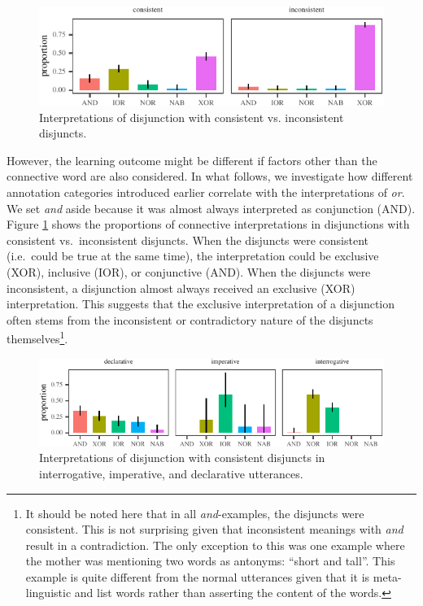 \documentclass[,man,floatsintext]{apa6}
\let\rmarkdownfootnote\footnote%
\def\footnote{\protect\rmarkdownfootnote}
\begin{document}
\begin{figure}[tb]

{\centering \includegraphics{figs/consistencyPlot-1} 

}

\caption{Interpretations of disjunction with consistent vs. inconsistent disjuncts.}\label{fig:consistencyPlot}
\end{figure}

However, the learning outcome might be different if factors other than the connective word are also considered. In what follows, we investigate how different annotation categories introduced earlier correlate with the interpretations of \emph{or}. We set \emph{and} aside because it was almost always interpreted as conjunction (AND). Figure \ref{fig:consistencyPlot} shows the proportions of connective interpretations in disjunctions with consistent vs.~inconsistent disjuncts. When the disjuncts were consistent (i.e.~could be true at the same time), the interpretation could be exclusive (XOR), inclusive (IOR), or conjunctive (AND). When the disjuncts were inconsistent, a disjunction almost always received an exclusive (XOR) interpretation. This suggests that the exclusive interpretation of a disjunction often stems from the inconsistent or contradictory nature of the disjuncts themselves\footnote{It should be noted here that in all \emph{and}-examples, the disjuncts were consistent. This is not surprising given that inconsistent meanings with \emph{and} result in a contradiction. The only exception to this was one example where the mother was mentioning two words as antonyms: \enquote{short and tall}. This example is quite different from the normal utterances given that it is meta-linguistic and list words rather than asserting the content of the words.}.

\begin{figure}[tb]

{\centering \includegraphics{figs/utterancePlot-1} 

}

\caption{Interpretations of disjunction with consistent disjuncts in interrogative, imperative, and declarative utterances.}\label{fig:utterancePlot}
\end{figure}
\end{document}
